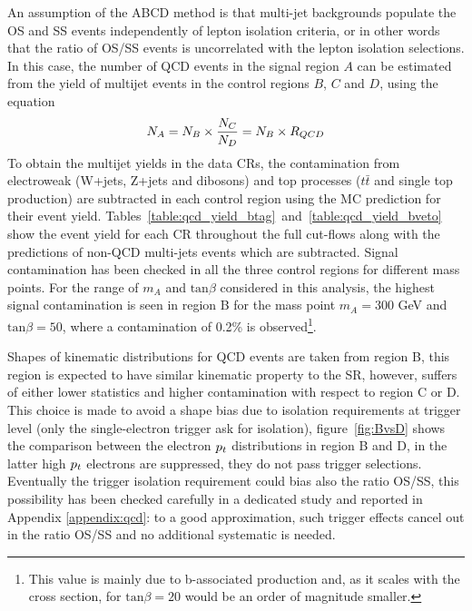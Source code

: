 An assumption of the ABCD method is that multi-jet backgrounds
populate the OS and SS events independently of lepton isolation
criteria, or in other words that the ratio of OS/SS events is uncorrelated 
with the lepton isolation selections. In this case, the number of QCD events in the signal region $A$ 
can be estimated from the yield of multijet events in the control regions $B$, $C$ and $D$, using the equation
\begin{equation} \label{eqn:qcdest}
N_{A}  = N_{B} \times \frac{N_{C}}{N_{D}} =  N_{B} \times R_{QCD}
\end{equation}
To obtain the multijet yields in the data CRs, the contamination
from electroweak (W+jets, Z+jets and dibosons) and top processes
($t\bar{t}$ and single top production) are  subtracted in each control region 
using the MC prediction for their event yield.  Tables~\ref{table:qcd_yield_btag}~and~\ref{table:qcd_yield_bveto}
show the event yield
for each CR throughout the full cut-flows along with the
predictions of non-QCD multi-jets events which are subtracted.
Signal contamination has been checked in all the three control regions for different 
mass points. For the range of $m_{A}$ and $\mathrm{tan}\beta$ considered in this analysis, the highest signal contamination 
is seen in region B for the mass point $m_{A} = 300$ GeV and $\mathrm{tan}\beta = 50$, where  a contamination 
of 0.2\% is observed\footnote
{
This value is mainly due to b-associated production and,
as it scales with the cross section, for $\mathrm{tan}\beta = 20$ would be an order of magnitude smaller.
}.

Shapes of kinematic distributions for QCD events are taken from 
region B, this region is expected to have similar kinematic property to the SR, however, suffers of either lower statistics 
and higher contamination with respect to region C or D.
This choice is made to avoid a shape bias due to isolation requirements at trigger level (only the single-electron trigger ask for isolation),
figure~\ref{fig:BvsD} shows the comparison between the electron $p_{t}$ distributions in region B and D, 
in the latter high $p_{t}$ electrons are suppressed, they do not pass trigger selections. 
Eventually the trigger isolation requirement could
bias also the ratio OS/SS, this possibility has been checked carefully
in a dedicated study and reported in Appendix \ref{appendix:qcd}:
to a good approximation, such trigger effects cancel out in the ratio
OS/SS and no additional systematic is needed.

